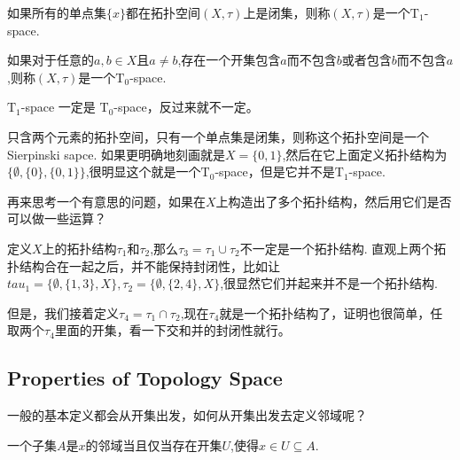 \begin{example}
如果所有的单点集$\{x\}$都在拓扑空间$(X,\tau)$上是闭集，则称$(X,\tau)$是一个$\text{T}_1$-space.
\end{example}

\begin{example}
如果对于任意的$a,b \in X$且$a \neq b$,存在一个开集包含$a$而不包含$b$或者包含$b$而不包含$a$,则称$(X,\tau)$是一个$\text{T}_0$-space.
\end{example}

$\text{T}_1$-space 一定是 $\text{T}_0$-space，反过来就不一定。

\begin{example}
只含两个元素的拓扑空间，只有一个单点集是闭集，则称这个拓扑空间是一个Sierpinski sapce. 如果更明确地刻画就是$X = \{0,1\}$,然后在它上面定义拓扑结构为$\{\emptyset,\{0\},\{0,1\}\}$,很明显这个就是一个$\text{T}_0$-space，但是它并不是$\text{T}_1$-space.
\end{example}

再来思考一个有意思的问题，如果在$X$上构造出了多个拓扑结构，然后用它们是否可以做一些运算？

\begin{example}
定义$X$上的拓扑结构$\tau_1$和$\tau_2$,那么$\tau_3 = \tau_1 \cup \tau_2$不一定是一个拓扑结构. 直观上两个拓扑结构合在一起之后，并不能保持封闭性，比如让$tau_1=\{\emptyset,\{1,3\},X\}, \tau_2 = \{\emptyset,\{2,4\},X\}$,很显然它们并起来并不是一个拓扑结构.

但是，我们接着定义$\tau_4 = \tau_1 \cap \tau_2$,现在$\tau_4$就是一个拓扑结构了，证明也很简单，任取两个$\tau_4$里面的开集，看一下交和并的封闭性就行。
\end{example}

\newpage
\subsection{Properties of Topology Space}

一般的基本定义都会从开集出发，如何从开集出发去定义邻域呢？

\begin{proposition}
一个子集$A$是$x$的邻域当且仅当存在开集$U$,使得$x \in U \subseteq A$.
\end{proposition}

